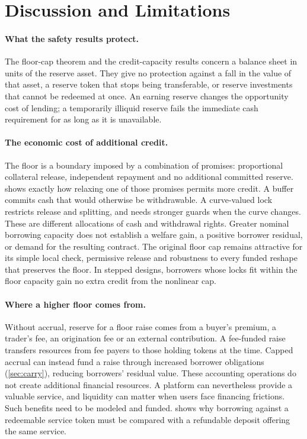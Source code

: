 \section{Discussion and Limitations}\label{sec:discussion}

\paragraph{What the safety results protect.}
The floor-cap theorem and the credit-capacity results concern a balance sheet in units of the reserve asset. They give no protection against a fall in the value of that asset, a reserve token that stops being transferable, or reserve investments that cannot be redeemed at once. An earning reserve changes the opportunity cost of lending; a temporarily illiquid reserve fails the immediate cash requirement for as long as it is unavailable.

\paragraph{The economic cost of additional credit.}
The floor is a boundary imposed by a combination of promises: proportional collateral release, independent repayment and no additional committed reserve.  shows exactly how relaxing one of those promises permits more credit. A buffer commits cash that would otherwise be withdrawable. A curve-valued lock restricts release and splitting, and needs stronger guards when the curve changes. These are different allocations of cash and withdrawal rights. Greater nominal borrowing capacity does not establish a welfare gain, a positive borrower residual, or demand for the resulting contract. The original floor cap remains attractive for its simple local check, permissive release and robustness to every funded reshape that preserves the floor. In stepped designs, borrowers whose locks fit within the floor capacity gain no extra credit from the nonlinear cap.

\paragraph{Where a higher floor comes from.}
Without accrual, reserve for a floor raise comes from a buyer's premium, a trader's fee, an origination fee or an external contribution. A fee-funded raise transfers resources from fee payers to those holding tokens at the time. Capped accrual can instead fund a raise through increased borrower obligations (\cref{sec:carry}), reducing borrowers' residual value. These accounting operations do not create additional financial resources. A platform can nevertheless provide a valuable service, and liquidity can matter when users face financing frictions. Such benefits need to be modeled and funded.  shows why borrowing against a redeemable service token must be compared with a refundable deposit offering the same service.

